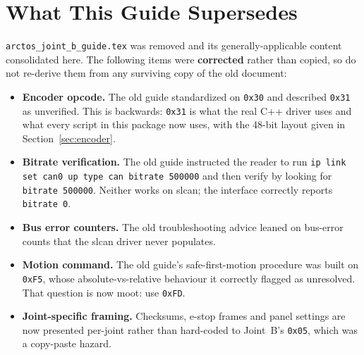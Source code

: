 \documentclass[11pt,letterpaper]{article}
\begin{document}
\section{What This Guide Supersedes}
\label{sec:superseded}

\texttt{arctos\_joint\_b\_guide.tex} was removed and its generally-applicable content
consolidated here. The following items were \textbf{corrected} rather than copied,
so do not re-derive them from any surviving copy of the old document:

\begin{itemize}
    \item \textbf{Encoder opcode.} The old guide standardized on \texttt{0x30} and
          described \texttt{0x31} as unverified. This is backwards: \texttt{0x31} is
          what the real C++ driver uses and what every script in this package now
          uses, with the 48-bit layout given in Section~\ref{sec:encoder}.
    \item \textbf{Bitrate verification.} The old guide instructed the reader to run
          \texttt{ip link set can0 up type can bitrate 500000} and then verify by
          looking for \texttt{bitrate 500000}. Neither works on slcan; the interface
          correctly reports \texttt{bitrate 0}.
    \item \textbf{Bus error counters.} The old troubleshooting advice leaned on
          bus-error counts that the slcan driver never populates.
    \item \textbf{Motion command.} The old guide's safe-first-motion procedure was
          built on \texttt{0xF5}, whose absolute-vs-relative behaviour it correctly
          flagged as unresolved. That question is now moot: use \texttt{0xFD}.
    \item \textbf{Joint-specific framing.} Checksums, e-stop frames and panel
          settings are now presented per-joint rather than hard-coded to Joint~B's
          \texttt{0x05}, which was a copy-paste hazard.
\end{itemize}
\end{document}
